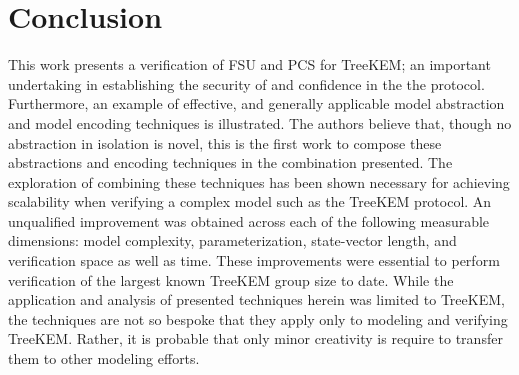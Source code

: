 \documentclass[runningheads]{llncs}
\newcommand{\Abrev}[1]{\gls{#1}}
\begin{document}
 
\section{Conclusion}

This work presents a verification of \Abrev{FSU} and \Abrev{PCS} for TreeKEM; an important undertaking in establishing the security of and confidence in the the protocol.
Furthermore, an example of effective, and generally applicable model abstraction and model encoding techniques is illustrated.
The authors believe that, though no abstraction in isolation is novel, this is the first work to compose these abstractions and encoding techniques in the combination presented.
The exploration of combining these techniques has been shown necessary for achieving scalability when verifying a complex model such as the TreeKEM protocol.
An unqualified improvement was obtained across each of the following measurable dimensions: model complexity,  parameterization, state-vector length, and verification space as well as time.
These improvements were essential to perform verification of the largest known TreeKEM group size to date.
While the application and analysis of presented techniques herein was limited to TreeKEM, the techniques are not so bespoke that they apply only to modeling and verifying TreeKEM.
Rather, it is probable that only minor creativity is require to transfer them to other modeling efforts.








\pagebreak
\end{document}
